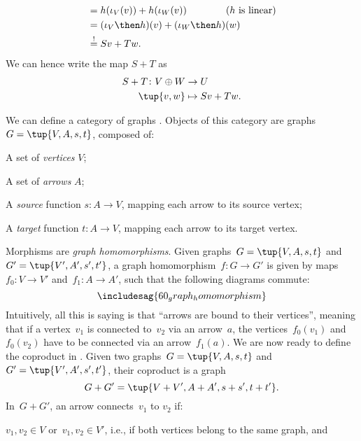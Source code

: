 \begin{example}
\begin{equation*}
\begin{aligned}
    &=h(\iota_V(v))+h(\iota_W(v)) \qquad \qquad (h \text{ is linear})\\
    &=(\iota_V\then h)(v)+(\iota_W\then h)(w)\\
    &\overset{!}{=}Sv+Tw.
    \end{aligned}
\end{equation*}
We can hence write the map $S+T$ as
\begin{equation*}
    \begin{aligned}
    S+T\colon V\oplus W&\to U\\
    \tup{v,w}&\mapsto Sv+Tw.
    \end{aligned}
\end{equation*}
\end{example}

\begin{example}
We can define a category of graphs \iindex{\Graph}. Objects of this category are graphs~$G=\tup{V,A,s,t}$, composed of:
\begin{compactitem}
\item A set of \emph{vertices} $V$;
\item A set of \emph{arrows} $A$;
\item A \emph{source} function $s\colon A\to V$, mapping each arrow to its source vertex;
\item A \emph{target} function $t\colon A\to V$, mapping each arrow to its target vertex.
\end{compactitem}
Morphisms are \emph{graph homomorphisms}. Given graphs~$G=\tup{V,A,s,t}$ and~$G'=\tup{V',A',s',t'}$, a graph homomorphism~$f\colon G\to G'$ is given by maps~$f_0\colon V\to V'$ and~$f_1\colon A\to A'$, such that the following diagrams commute:
\begin{equation*}
\includesag{60_graph_homomorphism}
\end{equation*}
Intuitively, all this is saying is that ``arrows are bound to their vertices'', meaning that if a vertex~$v_1$ is connected to~$v_2$ via an arrow~$a$, the vertices~$f_0(v_1)$ and~$f_0(v_2)$ have to be connected via an arrow~$f_1(a)$. We are now ready to define the coproduct in \Graph. Given two graphs~$G=\tup{V,A,s,t}$ and~$G'=\tup{V',A',s',t'}$, their coproduct is a graph
        \begin{equation*}
            G+G'=\tup{V+V',A+A',s+s',t+t'}.
        \end{equation*}
In~$G+G'$, an arrow connects~$v_1$ to $v_2$ if:
\begin{compactitem}
\item $v_1,v_2\in V$ or~$v_1,v_2\in V'$, i.e., if both vertices belong to the same graph, and

\end{compactitem}
\end{example}
